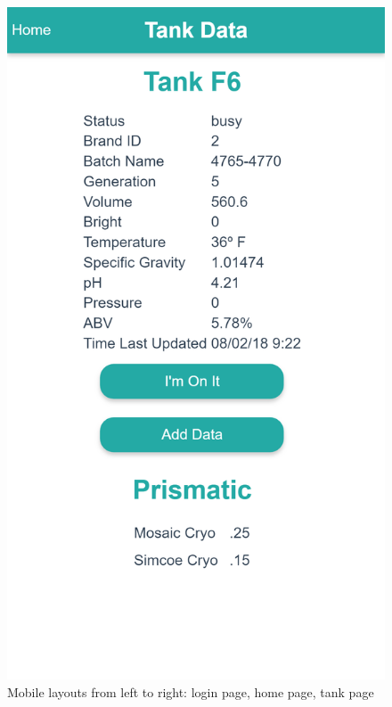 \begin{figure}[H]
\begin{multicols}{3}
            \includegraphics[width=\linewidth]{./img/mobile-tank-page.png}
        \end{multicols}
        \caption{Mobile layouts from left to right: login page, home page, tank page}
    \end{figure}
    
    \pagebreak
    
